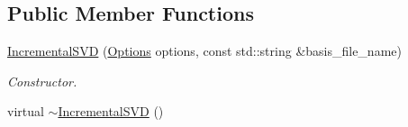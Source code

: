 \subsection*{Public Member Functions}
\begin{DoxyCompactItemize}
\item 
\hyperlink{class_c_a_r_o_m_1_1_incremental_s_v_d_ac6ed0c3f346323d614660b7aed97d7f4}{Incremental\-S\-V\-D} (\hyperlink{class_c_a_r_o_m_1_1_options}{Options} options, const std\-::string \&basis\-\_\-file\-\_\-name)
\begin{DoxyCompactList}\small\item\em Constructor. \end{DoxyCompactList}\item 
\hypertarget{class_c_a_r_o_m_1_1_incremental_s_v_d_a6ecab3fd6edb665831c8a7881a4843f0}{virtual \hyperlink{class_c_a_r_o_m_1_1_incremental_s_v_d_a6ecab3fd6edb665831c8a7881a4843f0}{$\sim$\-Incremental\-S\-V\-D} ()}\label{class_c_a_r_o_m_1_1_incremental_s_v_d_a6ecab3fd6edb665831c8a7881a4843f0}


\end{DoxyCompactItemize}
